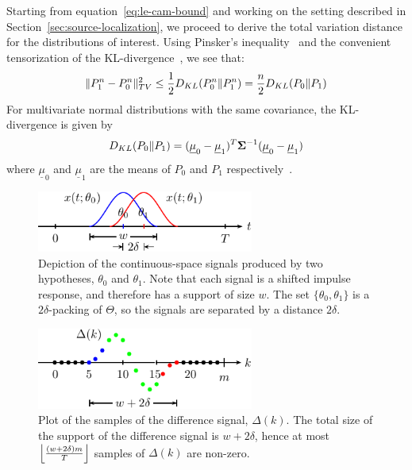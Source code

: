 \documentclass[conference]{IEEEtran}
\providecommand{\v}{}
\renewcommand{\v}[1]{\underline{#1}}
\providecommand{\m}{}
\renewcommand{\m}[1]{{\bf #1}}
\DeclarePairedDelimiter\norm{\lVert}{\rVert}
\DeclarePairedDelimiter\floor{\lfloor}{\rfloor}
\begin{document}
\begin{IEEEproof}
Starting from equation~\eqref{eq:le-cam-bound} and working on the setting
described in Section~\ref{sec:source-localization}, we proceed to derive the
total variation distance for the distributions of interest. Using Pinsker's
inequality~\cite{Pinsker} and the convenient tensorization of the
KL-divergence~\cite{tensorization}, we see that:
\begin{equation} \label{eq:pinsker-tensorization}
	\norm{P_1^n - P_0^n}_{TV}^2 \leq \frac{1}{2} D_{KL}(P_0^n \Vert P_1^n) = \frac{n}{2} D_{KL}(P_0 \Vert P_1)
\end{equation}
For multivariate normal distributions with the same covariance, the
KL-divergence is given by
\begin{equation} \label{eq:kl-div-normal}
	D_{KL}(P_0 \Vert P_1) = (\v \mu_0 - \v \mu_1)^T \m \Sigma^{-1} (\v \mu_0 - \v \mu_1)
\end{equation}
where $\v \mu_0$ and $\v \mu_1$ are the means of $P_0$ and $P_1$
respectively~\cite{KLDivNormal}.

\begin{figure}[t]
	\centering
	\includegraphics[width=2.8in]{overlap-middle-pics}
	\caption{Depiction of the continuous-space signals produced by two
		hypotheses, $\theta_0$ and $\theta_1$. Note that each signal is a
		shifted impulse response, and therefore has a support of size $w$.
		The set $\{\theta_0, \theta_1\}$ is a $2\delta$-packing of
		$\Theta$, so the signals are separated by a distance $2\delta$.}
	\label{fig:overlap-middle}
\end{figure}

\begin{figure}[t]
	\centering
	\includegraphics[width=2.8in]{delta-sampled-pics}
	\caption{Plot of the samples of the difference signal, $\Delta(k)$. The
		total size of the support of the difference signal is $w+2\delta$,
		hence at most $\floor*{\frac{(w + 2\delta)m}{T}}$ samples of
		$\Delta(k)$ are non-zero.}
	\label{fig:delta-sampled}
\end{figure}


\end{IEEEproof}
\end{document}
